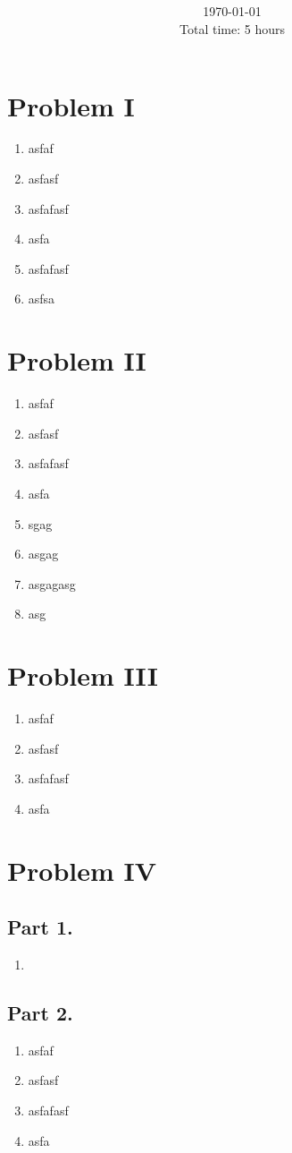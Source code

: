 \documentclass[letterpaper,11pt,twoside]{article}
\title{\textbf{\assignment}\\\course\\{\Large\institution}}
\author{\autor}
\date{\today\\Total time: 5 hours}
\begin{document}
\pagestyle{mainstyle}
\maketitle
\section*{Problem I}
\begin{enumerate}[itemsep=0pt,topsep=0pt,label=\alph*)]
  \item asfaf
  \item asfasf
  \item asfafasf
  \item asfa
  \item asfafasf
  \item asfsa
\end{enumerate}


\section*{Problem II}
\begin{enumerate}[itemsep=0pt,topsep=0pt,label=\alph*)]
  \item asfaf
  \item asfasf
  \item asfafasf
  \item asfa
  \item sgag
  \item asgag
  \item asgagasg
  \item asg
\end{enumerate}


\section*{Problem III}
\begin{enumerate}[itemsep=0pt,topsep=0pt,label=\alph*)]
  \item asfaf
  \item asfasf
  \item asfafasf
  \item asfa
\end{enumerate}


\section*{Problem IV}

\subsection*{Part 1.}
\begin{enumerate}[itemsep=0pt,topsep=0pt,label=\alph*)]
  \item 
\end{enumerate}

\subsection*{Part 2.}
\begin{enumerate}[itemsep=0pt,topsep=0pt,label=\alph*),start=2]
  \item asfaf
  \item asfasf
  \item asfafasf
  \item asfa
\end{enumerate}




%
\end{document}
